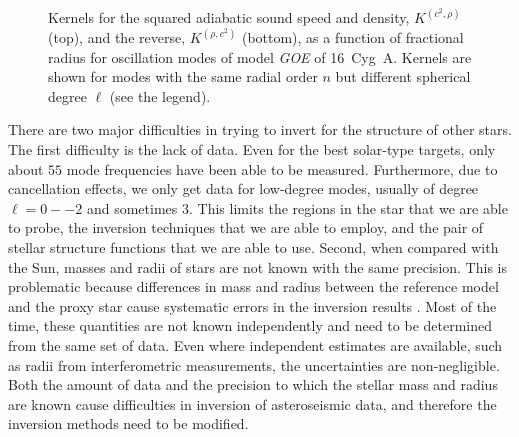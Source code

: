 \begin{figure}
    \centering
    \\
    \caption[$(c^2,\rho)$ kernels for 16~Cyg~A]{Kernels for the squared adiabatic sound speed and density, $K^{(c^2, \rho)}$ (top), and the reverse, $K^{(\rho, c^2)}$ (bottom), as a function of fractional radius for oscillation modes of model \emph{GOE} of 16~Cyg~A. Kernels are shown for modes with the same radial order $n$ but different spherical degree $\ell$ (see the legend). 
    \label{fig:c2-rho} }
\end{figure}


There are two major difficulties in trying to invert for the structure of other stars.
The first difficulty is the lack of data. 
Even for the best solar-type targets, only about $55$ mode frequencies have been able to be measured. 
Furthermore, due to cancellation effects, we only get data for low-degree modes, usually of degree ${\ell=0--2}$ and sometimes $3$. 
This limits the regions in the star that we are able to probe, the inversion techniques that we are able to employ, and the pair of stellar structure functions that we are able to use. 
Second, when compared with the Sun, masses and radii of stars are not known with the same precision. 
This is problematic because differences in mass and radius between the reference model and the proxy star cause systematic errors in the inversion results \citep[see][]{2003Ap&SS.284..153B}. 
Most of the time, these quantities are not known independently and need to be determined from the same set of data. 
Even where independent estimates are available, such as radii from interferometric measurements, the uncertainties are non-negligible. 
Both the amount of data and the precision to which the stellar mass and radius are known cause difficulties in inversion of asteroseismic data, and therefore the inversion methods need to be modified. 



